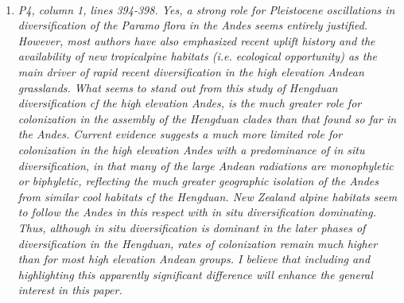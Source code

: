 \documentclass[12pt]{letter}
\begin{document}
\begin{letter}{ \\

}
\begin{enumerate}
  We agree that refugia is too restrictive a term in this context. We
  have edited this section (XXX) to describe how topographic
  differences between the Hengduan Mountains and Himalayas
  (north-south vs east-west) lead to different expectations of
  persistence via migration during glacial cycles.

  
\item \textit{P4, column 1, lines 394-398. Yes, a strong role for
    Pleistocene oscillations in diversification of the Paramo flora in
    the Andes seems entirely justified. However, most authors have
    also emphasized recent uplift history and the availability of new
    tropicalpine habitats (i.e. ecological opportunity) as the main
    driver of rapid recent diversification in the high elevation
    Andean grasslands. What seems to stand out from this study of
    Hengduan diversification cf the high elevation Andes, is the much
    greater role for colonization in the assembly of the Hengduan
    clades than that found so far in the Andes.  Current evidence
    suggests a much more limited role for colonization in the high
    elevation Andes with a predominance of in situ diversification, in
    that many of the large Andean radiations are monophyletic or
    biphyletic, reflecting the much greater geographic isolation of
    the Andes from similar cool habitats cf the Hengduan. New Zealand
    alpine habitats seem to follow the Andes in this respect with in
    situ diversification dominating.  Thus, although in situ
    diversification is dominant in the later phases of diversification
    in the Hengduan, rates of colonization remain much higher than for
    most high elevation Andean groups. I believe that including and
    highlighting this apparently significant difference will enhance
    the general interest in this paper.}


\end{enumerate}
\end{letter}
\end{document}
